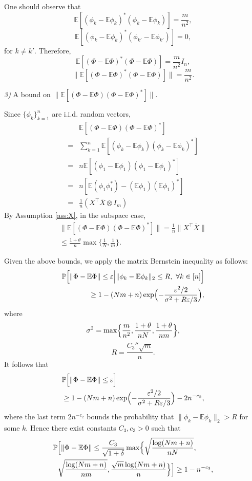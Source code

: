 \documentclass[11pt,journal]{IEEEtran}
\newcommand{\bbE}{\mathbb{E}}
\newcommand{\bbP}{\mathbb{P}}
\newcommand{\norm}[1]{\|{#1}\|}
\newcommand{\T}{\top}
\begin{document}
\begin{IEEEproof}
One should observe that
\[
\bbE [(\phi_k-\bbE \phi_k)^*(\phi_k-\bbE \phi_k)] = \frac{m}{n^2},
\]
\[
\bbE [(\phi_k-\bbE \phi_k)^*(\phi_{k'}-\bbE \phi_{k'})] = 0,
\]
for $k\neq k'$. Therefore,
\[
\bbE [(\Phi-\bbE \Phi)^*(\Phi-\bbE \Phi)] = \frac{m}{n^2} I_n,
\]	
\[
\norm{\bbE [(\Phi-\bbE \Phi)^*(\Phi-\bbE \Phi)]} = \frac{m}{n^2}.
\]

\emph{3)} A bound on $\norm{\bbE [(\Phi-\bbE \Phi)(\Phi-\bbE \Phi)^*]}$.

Since $\{\phi_k\}_{k=1}^{n}$ are i.i.d. random vectors,
	\begin{align*}
	& \bbE [(\Phi-\bbE \Phi)(\Phi-\bbE \Phi)^*] \\
	= & \sum_{k=1}^n \bbE [(\phi_k-\bbE \phi_k)(\phi_k-\bbE \phi_k)^*] \\
	= & n \bbE [(\phi_1-\bbE \phi_1)(\phi_1-\bbE \phi_1)^*] \\
	= & n [\bbE (\phi_1\phi_1^*) - (\bbE \phi_1)(\bbE \phi_1)^*]\\
	= & \frac{1}{n} (X^\T \overline{X} \otimes I_m)
	\end{align*}
By Assumption \ref{ass:X}, in the subspace case,
\begin{align*}
\norm{\bbE [(\Phi-\bbE \Phi)(\Phi-\bbE \Phi)^*]} = \frac{1}{n}\norm{X^\T \overline{X}} \\
\leq \frac{1+\theta}{n} \max\{\frac{1}{N},\frac{1}{m}\}.
\end{align*}

Given the above bounds, we apply the matrix Bernstein inequality \cite[Theorem 1.6]{Tropp2011} as follows:
\begin{align*}
\bbP\Bigl[ \norm{\Phi-\bbE \Phi} \leq \varepsilon \Big| \norm{\phi_k-\bbE \phi_k}_2\leq R, ~ \forall k\in[n] \Bigr] \\
\geq 1 - (Nm+n)\exp\Bigl(-\frac{\varepsilon^2/2}{\sigma^2 + R\varepsilon/3} \Bigr),
\end{align*} 
where
\[
\sigma^2 = \max\Bigl\{ \frac{m}{n^2}, \frac{1+\theta}{nN}, \frac{1+\theta}{nm} \Bigr\},
\]
\[
R = \frac{C_3''\sqrt{m}}{n} .
\]
It follows that
\begin{align*}
& \bbP\Bigl[ \norm{\Phi-\bbE \Phi} \leq \varepsilon \Bigr] \\
& \geq 1 -  (Nm+n)\exp\Bigl(-\frac{\varepsilon^2/2}{\sigma^2 + R\varepsilon/3} \Bigr) - 2n^{-c_2},
\end{align*}
where the last term $2n^{-c_2}$ bounds the probability that $\norm{\phi_k-\bbE \phi_k}_2>R$ for some $k$.
Hence there exist constants $C_3, c_3 >0$ such that
\begin{align*}
& \bbP\Bigl[ \norm{\Phi-\bbE \Phi} \leq \frac{C_3}{\sqrt{1+\delta}} \max\Bigl\{ \sqrt{\frac{\log (Nm+n)}{nN}}, \\
&~~ \sqrt{\frac{\log(Nm+n)}{nm}},\frac{\sqrt{m}\log(Nm+n)}{n}\Bigr\}
\Bigr] \geq 1- n^{-c_3},
\end{align*}


\end{IEEEproof}
\end{document}
